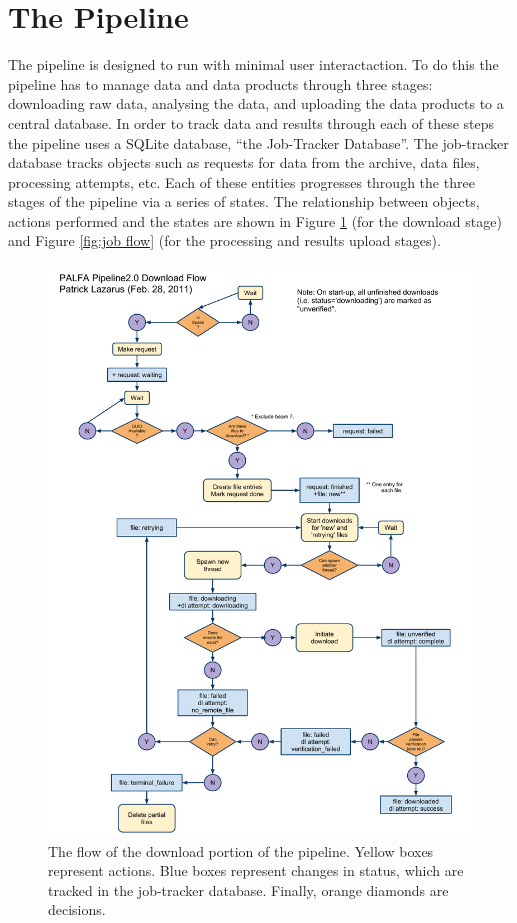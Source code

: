 \documentclass[12pt]{article}
\begin{document}
\section{The Pipeline}
The pipeline is designed to run with minimal user interactaction. To do this the pipeline has to manage data and data products through three stages: downloading raw data, analysing the data, and uploading the data products to a central database. In order to track data and results through each of these steps the pipeline uses a SQLite database, ``the Job-Tracker Database''. The job-tracker database tracks objects such as requests for data from the archive, data files, processing attempts, etc. Each of these entities progresses through the three stages of the pipeline via a series of states. The relationship between objects, actions performed and the states are shown in Figure \ref{fig:download flow} (for the download stage) and Figure \ref{fig:job flow} (for the processing and results upload stages).

\begin{figure}
    \centering
    \includegraphics[scale=0.5]{./figs/ThreadedDownloadFlow.pdf}
    \caption{The flow of the download portion of the pipeline. Yellow boxes represent actions. Blue boxes represent changes in status, which are tracked in the job-tracker database. Finally, orange diamonds are decisions. \label{fig:download flow}}
\end{figure}
\end{document}
